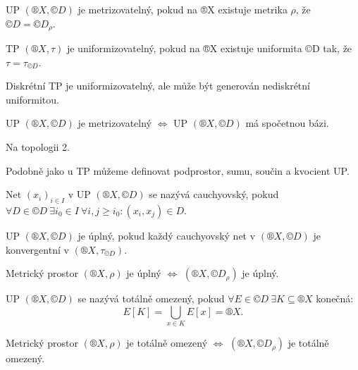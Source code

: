 \documentclass[12pt]{article}					%
\begin{document}
    \begin{definice}
        UP $(®X, ©D)$ je metrizovatelný, pokud na ®X existuje metrika $\rho$, že $©D = ©D_\rho$.

        TP $(®X, \tau)$ je uniformizovatelný, pokud na ®X existuje uniformita ©D tak, že $\tau = \tau_{©D}$.
    \end{definice}

    \begin{priklady}
        Diskrétní TP je uniformizovatelný, ale může být generován nediskrétní uniformitou.
    \end{priklady}

    \begin{veta}[Metrizovatelnost UP]
        UP $(®X, ©D)$ je metrizovatelný $\Leftrightarrow$ UP $(®X, ©D)$ má spočetnou bázi.

        \begin{dukazin}
            Na topologii 2.
        \end{dukazin}
    \end{veta}

    \begin{poznamka}
        Podobně jako u TP můžeme definovat podprostor, sumu, součin a kvocient UP.
    \end{poznamka}

    \begin{definice}[Net]
        Net $(x_i)_{i \in I}$ v UP $(®X, ©D)$ se nazývá cauchyovský, pokud $\forall D \in ©D\ \exists i_0 \in I\ \forall i, j ≥ i_0: (x_i, x_j) \in D$.

        UP $(®X, ©D)$ je úplný, pokud každý cauchyovský net v $(®X, ©D)$ je konvergentní v $(®X, \tau_{©D})$.
    \end{definice}

    \begin{poznamka}
        Metrický prostor $(®X, \rho)$ je úplný $\Leftrightarrow$ $(®X, ©D_\rho)$ je úplný.
    \end{poznamka}

    \begin{definice}
        UP $(®X, ©D)$ se nazývá totálně omezený, pokud $\forall E \in ©D\ \exists K \subseteq ®X$ konečná:
        $$ E[K] = \bigcup_{x \in K} E[x] = ®X. $$
    \end{definice}

    \begin{poznamka}
        Metrický prostor $(®X, \rho)$ je totálně omezený $\Leftrightarrow$ $(®X, ©D_\rho)$ je totálně omezený.
    \end{poznamka}
\end{document}
